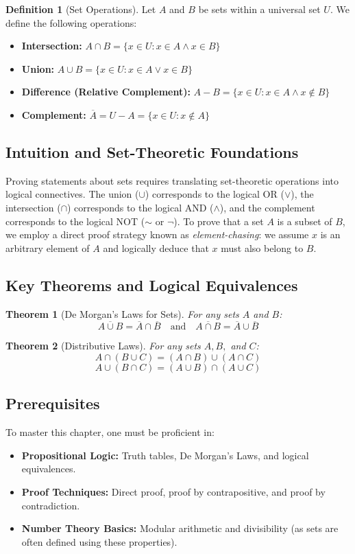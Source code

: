 \documentclass[11pt]{article}
\newtheorem{theorem}{Theorem}[section]
\theoremstyle{definition}
\newtheorem{definition}{Definition}[section]
\theoremstyle{remark}
\begin{document}
\begin{definition}[Set Operations]
Let $A$ and $B$ be sets within a universal set $U$. We define the following operations:
\begin{itemize}
    \item \textbf{Intersection:} $A \cap B = \{x \in U : x \in A \land x \in B\}$
    \item \textbf{Union:} $A \cup B = \{x \in U : x \in A \lor x \in B\}$
    \item \textbf{Difference (Relative Complement):} $A - B = \{x \in U : x \in A \land x \notin B\}$
    \item \textbf{Complement:} $\overline{A} = U - A = \{x \in U : x \notin A\}$
\end{itemize}
\end{definition}

\subsection{Intuition and Set-Theoretic Foundations}
Proving statements about sets requires translating set-theoretic operations into logical connectives. The union ($\cup$) corresponds to the logical OR ($\lor$), the intersection ($\cap$) corresponds to the logical AND ($\land$), and the complement corresponds to the logical NOT ($\sim$ or $\neg$). To prove that a set $A$ is a subset of $B$, we employ a direct proof strategy known as \textit{element-chasing}: we assume $x$ is an arbitrary element of $A$ and logically deduce that $x$ must also belong to $B$.

\subsection{Key Theorems and Logical Equivalences}
\begin{theorem}[De Morgan's Laws for Sets]
For any sets $A$ and $B$:
\[ \overline{A \cup B} = \overline{A} \cap \overline{B} \quad \text{and} \quad \overline{A \cap B} = \overline{A} \cup \overline{B} \]
\end{theorem}

\begin{theorem}[Distributive Laws]
For any sets $A, B,$ and $C$:
\[ A \cap (B \cup C) = (A \cap B) \cup (A \cap C) \]
\[ A \cup (B \cap C) = (A \cup B) \cap (A \cup C) \]
\end{theorem}

\subsection{Prerequisites}
To master this chapter, one must be proficient in:
\begin{itemize}
    \item \textbf{Propositional Logic:} Truth tables, De Morgan's Laws, and logical equivalences.
    \item \textbf{Proof Techniques:} Direct proof, proof by contrapositive, and proof by contradiction.
    \item \textbf{Number Theory Basics:} Modular arithmetic and divisibility (as sets are often defined using these properties).
\end{itemize}
\end{document}
